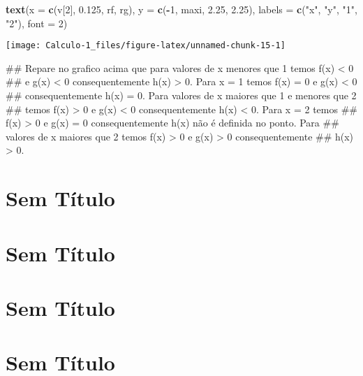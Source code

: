 \documentclass[]{book}
\newenvironment{Shaded}{\begin{snugshade}}{\end{snugshade}}
\newcommand{\KeywordTok}[1]{\textcolor[rgb]{0.13,0.29,0.53}{\textbf{#1}}}
\newcommand{\DataTypeTok}[1]{\textcolor[rgb]{0.13,0.29,0.53}{#1}}
\newcommand{\DecValTok}[1]{\textcolor[rgb]{0.00,0.00,0.81}{#1}}
\newcommand{\FloatTok}[1]{\textcolor[rgb]{0.00,0.00,0.81}{#1}}
\newcommand{\StringTok}[1]{\textcolor[rgb]{0.31,0.60,0.02}{#1}}
\newcommand{\OperatorTok}[1]{\textcolor[rgb]{0.81,0.36,0.00}{\textbf{#1}}}
\newcommand{\NormalTok}[1]{#1}
\begin{document}
\begin{enumerate}
\begin{Shaded}
\begin{Highlighting}[]
\KeywordTok{text}\NormalTok{(}\DataTypeTok{x =} \KeywordTok{c}\NormalTok{(v[}\DecValTok{2}\NormalTok{], }\FloatTok{0.125}\NormalTok{, rf, rg), }\DataTypeTok{y =} \KeywordTok{c}\NormalTok{(}\OperatorTok{-}\DecValTok{1}\NormalTok{, maxi, }\FloatTok{2.25}\NormalTok{, }\FloatTok{2.25}\NormalTok{),}
 \DataTypeTok{labels =} \KeywordTok{c}\NormalTok{(}\StringTok{"x"}\NormalTok{, }\StringTok{"y"}\NormalTok{, }\StringTok{"1"}\NormalTok{, }\StringTok{"2"}\NormalTok{), }\DataTypeTok{font =} \DecValTok{2}\NormalTok{)}
\end{Highlighting}
\end{Shaded}

  \begin{center}\texttt{[image: Calculo-1\_files/figure-latex/unnamed-chunk-15-1]} \end{center}

\begin{Shaded}
\begin{Highlighting}[]
\NormalTok{##  Repare no grafico acima que para valores de x menores que 1 temos f(x) < 0}
\NormalTok{## e g(x) < 0 consequentemente h(x) > 0. Para x = 1 temos f(x) = 0 e g(x) < 0}
\NormalTok{## consequentemente h(x) = 0. Para valores de x maiores que 1 e menores que 2}
\NormalTok{## temos f(x) > 0 e g(x) < 0 consequentemente h(x) < 0. Para x = 2 temos}
\NormalTok{## f(x) > 0 e g(x) = 0 consequentemente h(x) não é definida no ponto. Para}
\NormalTok{## valores de x maiores que 2 temos f(x) > 0 e g(x) > 0 consequentemente}
\NormalTok{## h(x) > 0.}
\end{Highlighting}
\end{Shaded}
\end{enumerate}

\chapter{Sem Título}\label{sem-titulo}

\chapter{Sem Título}\label{sem-titulo-1}

\chapter{Sem Título}\label{sem-titulo-2}

\chapter{Sem Título}\label{sem-titulo-3}


\end{document}
